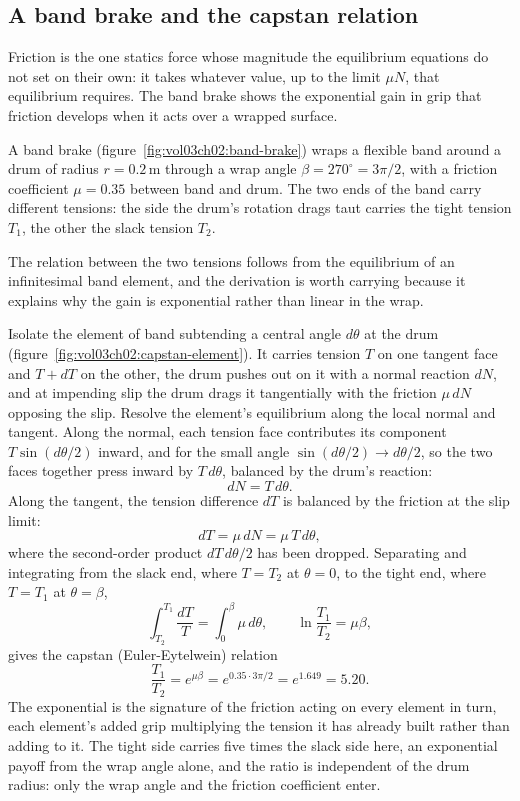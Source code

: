 \subsection{A band brake and the capstan relation}

Friction is the one statics force whose magnitude the equilibrium
equations do not set on their own: it takes whatever value, up to the
limit $\mu N$, that equilibrium requires. The band brake shows the
exponential gain in grip that friction develops when it acts over a
wrapped surface.

A band brake (figure~\ref{fig:vol03ch02:band-brake}) wraps a flexible
band around a drum of radius $r = 0.2\,\si{\meter}$ through a wrap angle
$\beta = 270^{\circ} = 3\pi/2$, with a friction coefficient
$\mu = 0.35$ between band and drum. The two ends of the band carry
different tensions: the side the drum's rotation drags taut carries the
tight tension $T_1$, the other the slack tension $T_2$.

The relation between the two tensions follows from the equilibrium of an
infinitesimal band element, and the derivation is worth carrying because
it explains why the gain is exponential rather than linear in the wrap.

Isolate the element of band subtending a central angle $d\theta$ at the
drum (figure~\ref{fig:vol03ch02:capstan-element}). It carries tension $T$
on one tangent face and $T + dT$ on the other, the drum pushes out on it
with a normal reaction $dN$, and at impending slip the drum drags it
tangentially with the friction $\mu\,dN$ opposing the slip. Resolve the
element's equilibrium along the local normal and tangent. Along the
normal, each tension face contributes its component $T\sin(d\theta/2)$
inward, and for the small angle $\sin(d\theta/2)\to d\theta/2$, so the two
faces together press inward by $T\,d\theta$, balanced by the drum's
reaction:
\[
dN = T\,d\theta.
\]
Along the tangent, the tension difference $dT$ is balanced by the
friction at the slip limit:
\[
dT = \mu\,dN = \mu\,T\,d\theta,
\]
where the second-order product $dT\,d\theta/2$ has been dropped.
Separating and integrating from the slack end, where $T = T_2$ at
$\theta = 0$, to the tight end, where $T = T_1$ at $\theta = \beta$,
\[
\int_{T_2}^{T_1}\frac{dT}{T} = \int_0^\beta \mu\,d\theta, \qquad
\ln\frac{T_1}{T_2} = \mu\beta,
\]
gives the capstan (Euler-Eytelwein) relation
\[
\frac{T_1}{T_2} = e^{\mu\beta} = e^{0.35 \cdot 3\pi/2}
= e^{1.649} = 5.20.
\]
The exponential is the signature of the friction acting on every element
in turn, each element's added grip multiplying the tension it has already
built rather than adding to it. The tight side carries five times the
slack side here, an exponential payoff from the wrap angle alone, and the
ratio is independent of the drum radius: only the wrap angle and the
friction coefficient enter.

